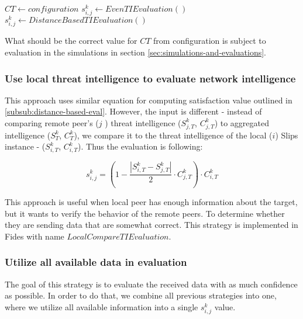 \begin{algorithm}
\caption{$ThresholdTIEvaluation$}\label{alg:threshold-ti-evaluation}
\begin{algorithmic}[1]
\State ${CT} \gets configuration$ 
	\State $s^{k}_{i, j} \gets EvenTIEvaluation()$
\Else
    \State $s^{k}_{i, j} \gets DistanceBasedTIEvaluation()$
\EndIf
\end{algorithmic}
\end{algorithm}

\noindent What should be the correct value for $CT$ from configuration is subject to evaluation in the simulations in section \ref{sec:simulations-and-evaluations}.

\subsubsection{Use local threat intelligence to evaluate network intelligence}
\label{subsub:use-local-threat-to-evaluate}
This approach uses similar equation for computing satisfaction value outlined in \ref{subsub:distance-based-eval}. However, the input is different - instead of comparing remote peer's ($j$ ) threat intelligence ($S^{k}_{j, T}$, $C^{k}_{j, T}$) to aggregated intelligence ($S^{k}_{T}$, $C^{k}_{T}$), we compare it to the threat intelligence of the local ($i$) Slips instance - ($S^{k}_{i, T}$, $C^{k}_{i, T}$). Thus the evaluation is following:

\begin{equation}
s^{k}_{i, j} = (1 - \frac{|{S}^{k}_{i, T} - S^{k}_{j, T}|}{2} \cdot C^{k}_{j, T}) \cdot C^{k}_{i, T}
\end{equation}

This approach is useful when local peer has enough information about the target, but it wants to verify the behavior of the remote peers.
To determine whether they are sending data that are somewhat correct. This strategy is implemented in Fides with name $LocalCompareTIEvaluation$.

\subsubsection{Utilize all available data in evaluation}
The goal of this strategy is to evaluate the received data with as much confidence as possible. 
In order to do that, we combine all previous strategies into one, where we utilize all available information into a single $s^{k}_{i, j}$ value.

